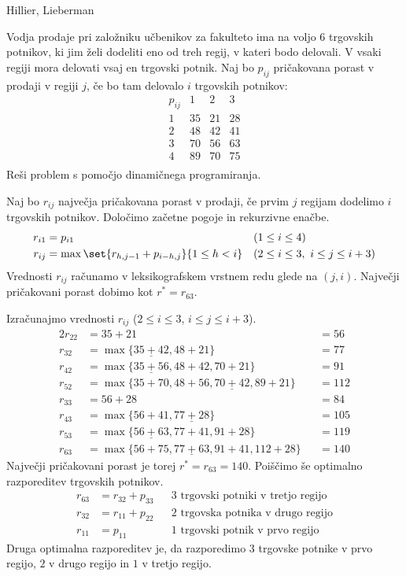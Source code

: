 \begin{naloga}{Hillier, Lieberman}{\cite[Problem~11.2-2]{hl}}
\begin{vprasanje}
Vodja prodaje pri založniku učbenikov za fakulteto
ima na voljo $6$ trgovskih potnikov,
ki jim želi dodeliti eno od treh regij, v kateri bodo delovali.
V vsaki regiji mora delovati vsaj en trgovski potnik.
Naj bo $p_{ij}$ pričakovana porast v prodaji v regiji $j$,
če bo tam delovalo $i$ trgovskih potnikov:
$$
\begin{array}{c|ccc}
p_{ij} & 1 & 2 & 3 \\
\hline
1 & 35 & 21 & 28 \\
2 & 48 & 42 & 41 \\
3 & 70 & 56 & 63 \\
4 & 89 & 70 & 75 \\
\end{array}
$$
Reši problem s pomočjo dinamičnega programiranja.
\end{vprasanje}

\begin{odgovor}
Naj bo $r_{ij}$ največja pričakovana porast v prodaji,
če prvim $j$ regijam dodelimo $i$ trgovskih potnikov.
Določimo začetne pogoje in rekurzivne enačbe.
\begin{align*}
r_{i1} &= p_{i1} && (1 \le i \le 4) \\
r_{ij} &= \max\set{r_{h,j-1} + p_{i-h,j}}{1 \le h < i}
&& (2 \le i \le 3, \ i \le j \le i+3)
\end{align*}
Vrednosti $r_{ij}$ računamo v leksikografskem vrstnem redu glede na $(j, i)$.
Največji pričakovani porast dobimo kot $r^* = r_{63}$.

\needspace{\baselineskip}
Izračunajmo vrednosti $r_{ij}$ ($2 \le i \le 3$, $i \le j \le i+3$).
\begin{alignat*}{2}
r_{22} &= 35 + 21 &&= 56 \\
r_{32} &= \max\{\underline{35+42}, 48+21\} &&= 77 \\
r_{42} &= \max\{\underline{35+56}, 48+42, 70+21\} &&= 91 \\
r_{52} &= \max\{35+70, 48+56, \underline{70+42}, 89+21\} &&= 112 \\
r_{33} &= 56 + 28 &&= 84 \\
r_{43} &= \max\{56+41, \underline{77+28}\} &&= 105 \\
r_{53} &= \max\{\underline{56+63}, 77+41, 91+28\} &&= 119 \\
r_{63} &= \max\{56+75, \underline{77+63}, 91+41, 112+28\} &&= 140
\end{alignat*}
Največji pričakovani porast je torej $r^* = r_{63} = 140$.
Poiščimo še optimalno razporeditev trgovskih potnikov.
\begin{align*}
r_{63} &= r_{32} + p_{33} && \text{$3$ trgovski potniki v tretjo regijo} \\
r_{32} &= r_{11} + p_{22} && \text{$2$ trgovska potnika v drugo regijo} \\
r_{11} &= p_{11}          && \text{$1$ trgovski potnik v prvo regijo}
\end{align*}
Druga optimalna razporeditev je,
da razporedimo $3$ trgovske potnike v prvo regijo,
$2$ v drugo regijo in $1$ v tretjo regijo.
\end{odgovor}
\end{naloga}
